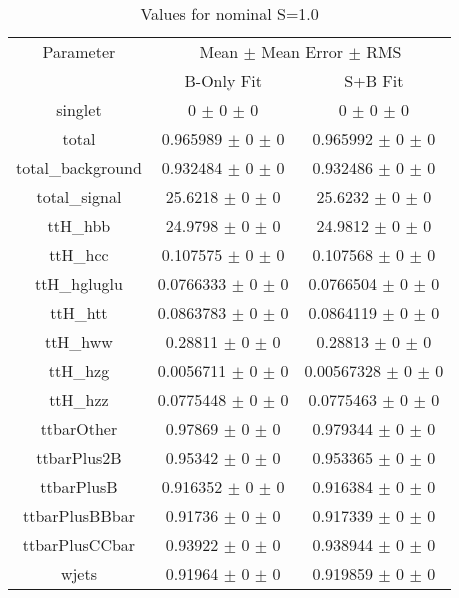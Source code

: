 \begin{table}
\centering
\caption{Values for nominal S=1.0}
\begin{tabular}{ccc}
\toprule
Parameter 	& \multicolumn{2}{c}{Mean $\pm$ Mean Error $\pm$ RMS}\\
 	& B-Only Fit & S+B Fit\\
\midrule
singlet 	& \num{0} $\pm$ \num{0} $\pm$ \num{0} 	& \num{0} $\pm$ \num{0} $\pm$ \num{0}\\
total 	& \num{0.965989} $\pm$ \num{0} $\pm$ \num{0} 	& \num{0.965992} $\pm$ \num{0} $\pm$ \num{0}\\
total\_background 	& \num{0.932484} $\pm$ \num{0} $\pm$ \num{0} 	& \num{0.932486} $\pm$ \num{0} $\pm$ \num{0}\\
total\_signal 	& \num{25.6218} $\pm$ \num{0} $\pm$ \num{0} 	& \num{25.6232} $\pm$ \num{0} $\pm$ \num{0}\\
ttH\_hbb 	& \num{24.9798} $\pm$ \num{0} $\pm$ \num{0} 	& \num{24.9812} $\pm$ \num{0} $\pm$ \num{0}\\
ttH\_hcc 	& \num{0.107575} $\pm$ \num{0} $\pm$ \num{0} 	& \num{0.107568} $\pm$ \num{0} $\pm$ \num{0}\\
ttH\_hgluglu 	& \num{0.0766333} $\pm$ \num{0} $\pm$ \num{0} 	& \num{0.0766504} $\pm$ \num{0} $\pm$ \num{0}\\
ttH\_htt 	& \num{0.0863783} $\pm$ \num{0} $\pm$ \num{0} 	& \num{0.0864119} $\pm$ \num{0} $\pm$ \num{0}\\
ttH\_hww 	& \num{0.28811} $\pm$ \num{0} $\pm$ \num{0} 	& \num{0.28813} $\pm$ \num{0} $\pm$ \num{0}\\
ttH\_hzg 	& \num{0.0056711} $\pm$ \num{0} $\pm$ \num{0} 	& \num{0.00567328} $\pm$ \num{0} $\pm$ \num{0}\\
ttH\_hzz 	& \num{0.0775448} $\pm$ \num{0} $\pm$ \num{0} 	& \num{0.0775463} $\pm$ \num{0} $\pm$ \num{0}\\
ttbarOther 	& \num{0.97869} $\pm$ \num{0} $\pm$ \num{0} 	& \num{0.979344} $\pm$ \num{0} $\pm$ \num{0}\\
ttbarPlus2B 	& \num{0.95342} $\pm$ \num{0} $\pm$ \num{0} 	& \num{0.953365} $\pm$ \num{0} $\pm$ \num{0}\\
ttbarPlusB 	& \num{0.916352} $\pm$ \num{0} $\pm$ \num{0} 	& \num{0.916384} $\pm$ \num{0} $\pm$ \num{0}\\
ttbarPlusBBbar 	& \num{0.91736} $\pm$ \num{0} $\pm$ \num{0} 	& \num{0.917339} $\pm$ \num{0} $\pm$ \num{0}\\
ttbarPlusCCbar 	& \num{0.93922} $\pm$ \num{0} $\pm$ \num{0} 	& \num{0.938944} $\pm$ \num{0} $\pm$ \num{0}\\
wjets 	& \num{0.91964} $\pm$ \num{0} $\pm$ \num{0} 	& \num{0.919859} $\pm$ \num{0} $\pm$ \num{0}\\
\bottomrule
\end{tabular}
\end{table}